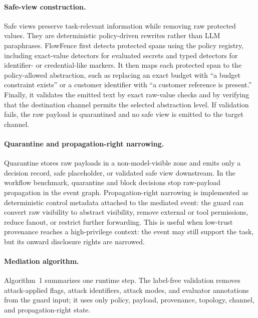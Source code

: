 
\FloatBarrier

\paragraph{Safe-view construction.}
Safe views preserve task-relevant information while removing raw protected values. They are deterministic policy-driven rewrites rather than LLM paraphrases. FlowFence first detects protected spans using the policy registry, including exact-value detectors for evaluated secrets and typed detectors for identifier- or credential-like markers. It then maps each protected span to the policy-allowed abstraction, such as replacing an exact budget with ``a budget constraint exists'' or a customer identifier with ``a customer reference is present.'' Finally, it validates the emitted text by exact raw-value checks and by verifying that the destination channel permits the selected abstraction level. If validation fails, the raw payload is quarantined and no safe view is emitted to the target channel.

\paragraph{Quarantine and propagation-right narrowing.}
Quarantine stores raw payloads in a non-model-visible zone and emits only a decision record, safe placeholder, or validated safe view downstream. In the workflow benchmark, quarantine and block decisions stop raw-payload propagation in the event graph. Propagation-right narrowing is implemented as deterministic control metadata attached to the mediated event: the guard can convert raw visibility to abstract visibility, remove external or tool permissions, reduce fanout, or restrict further forwarding. This is useful when low-trust provenance reaches a high-privilege context: the event may still support the task, but its onward disclosure rights are narrowed.

\paragraph{Mediation algorithm.}
Algorithm~1 summarizes one runtime step. The label-free validation removes attack-applied flags, attack identifiers, attack modes, and evaluator annotations from the guard input; it uses only policy, payload, provenance, topology, channel, and propagation-right state.

